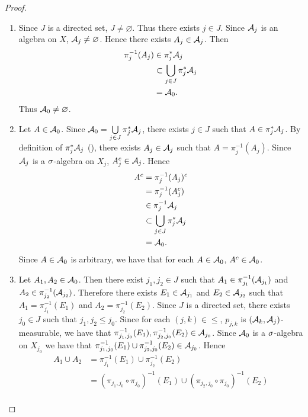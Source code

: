 \documentclass{book}
\begin{document}
\begin{proof}\
	\begin{enumerate}
		\item Since $J$ is a directed set, $J \neq \varnothing$. Thus there exists $j \in J$. Since $\mathcal{A}_j$ is an algebra on $X$, $\mathcal{A}_j \neq \varnothing$. Hence there exists $A_j \in \mathcal{A}_j$. Then 
		\begin{align*}
			\pi_j^{-1}(A_j) 
			& \in \pi_j^*\mathcal{A}_j \\
			& \subset  \bigcup\limits_{j \in J} \pi_j^*\mathcal{A}_j \\
			& = \mathcal{A}_0.
		\end{align*} 
		Thus $\mathcal{A}_0 \neq \varnothing$.
		\item Let $A \in \mathcal{A}_0$. Since $\mathcal{A}_0 = \bigcup\limits_{j \in J} \pi_j^*\mathcal{A}_j $, there exists $j \in J$ such that $A \in \pi_j^*\mathcal{A}_j$. By definition of $\pi_j^* \mathcal{A}_j$ (), there exists $A_j \in \mathcal{A}_j$ such that $A = \pi_j^{-1}(A_j)$. Since $\mathcal{A}_j$ is a $\sigma$-algebra on $X_j$, $A_j^c \in \mathcal{A}_j$. Hence 
		\begin{align*}
			A^c
			& = \pi_j^{-1}(A_j)^c \\
			& = \pi_j^{-1}(A_j^c) \\
			& \in \pi_j^{-1} \mathcal{A}_j \\
			& \subset \bigcup\limits_{j \in J} \pi_j^*\mathcal{A}_j \\
			& = \mathcal{A}_0.
		\end{align*} 
		Since $A \in \mathcal{A}_0$ is arbitrary, we have that for each $A \in \mathcal{A}_0$, $A^c \in \mathcal{A}_0$. 
		\item Let $A_1,A_2 \in \mathcal{A}_0$. Then there exist $j_1,j_2 \in J$ such that $A_1 \in \pi_{j_1}^{-1}(\mathcal{A}_{j_1})$ and $A_2 \in \pi_{j_2}^{-1}(\mathcal{A}_{j_2})$. Therefore there exists $E_1 \in \mathcal{A}_{j_1}$ and $E_2 \in \mathcal{A}_{j_2}$ such that $A_1 = \pi_{j_1}^{-1}(E_1)$ and $A_2 = \pi_{j_2}^{-1}(E_2)$. Since $J$ is a directed set, there exists $j_0 \in J$ such that $j_1, j_2 \leq j_0$. Since for each $(j,k) \in {\leq}$, $p_{j,k}$ is $(\mathcal{A}_k, \mathcal{A}_j)$-measurable, we have that $\pi_{j_1, j_0}^{-1}(E_1), \pi_{j_2, j_0}^{-1}(E_2) \in \mathcal{A}_{j_0}$. Since $\mathcal{A}_0$ is a $\sigma$-algebra on $X_{j_0}$ we have that $\pi_{j_1, j_0}^{-1}(E_1) \cup \pi_{j_2, j_0}^{-1}(E_2) \in \mathcal{A}_{j_0}$. Hence 
		\begin{align*}
			A_1 \cup A_2
			& = \pi_{j_1}^{-1}(E_1) \cup \pi_{j_2}^{-1}(E_2) \\
			& = (\pi_{j_1, j_0} \circ \pi_{j_0})^{-1}(E_1) \cup (\pi_{j_2, j_0} \circ \pi_{j_0})^{-1}(E_2) \\

\end{align*}
\end{enumerate}
\end{proof}
\end{document}
